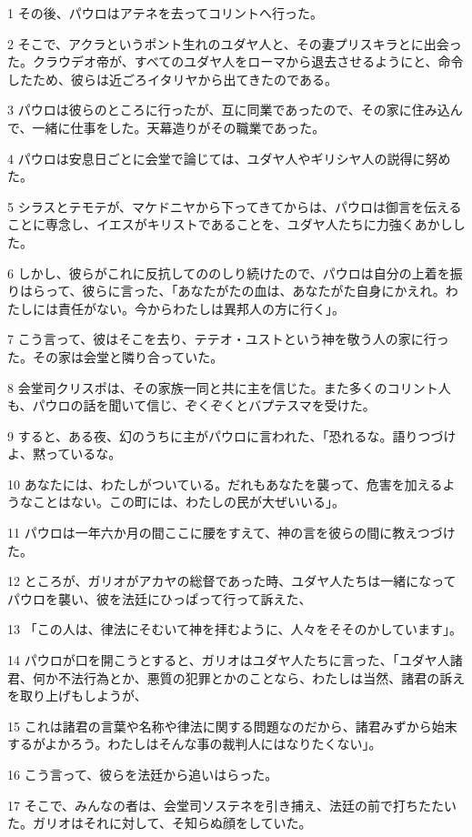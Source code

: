 \par 1 その後、パウロはアテネを去ってコリントへ行った。
\par 2 そこで、アクラというポント生れのユダヤ人と、その妻プリスキラとに出会った。クラウデオ帝が、すべてのユダヤ人をローマから退去させるようにと、命令したため、彼らは近ごろイタリヤから出てきたのである。
\par 3 パウロは彼らのところに行ったが、互に同業であったので、その家に住み込んで、一緒に仕事をした。天幕造りがその職業であった。
\par 4 パウロは安息日ごとに会堂で論じては、ユダヤ人やギリシヤ人の説得に努めた。
\par 5 シラスとテモテが、マケドニヤから下ってきてからは、パウロは御言を伝えることに専念し、イエスがキリストであることを、ユダヤ人たちに力強くあかしした。
\par 6 しかし、彼らがこれに反抗してののしり続けたので、パウロは自分の上着を振りはらって、彼らに言った、「あなたがたの血は、あなたがた自身にかえれ。わたしには責任がない。今からわたしは異邦人の方に行く」。
\par 7 こう言って、彼はそこを去り、テテオ・ユストという神を敬う人の家に行った。その家は会堂と隣り合っていた。
\par 8 会堂司クリスポは、その家族一同と共に主を信じた。また多くのコリント人も、パウロの話を聞いて信じ、ぞくぞくとバプテスマを受けた。
\par 9 すると、ある夜、幻のうちに主がパウロに言われた、「恐れるな。語りつづけよ、黙っているな。
\par 10 あなたには、わたしがついている。だれもあなたを襲って、危害を加えるようなことはない。この町には、わたしの民が大ぜいいる」。
\par 11 パウロは一年六か月の間ここに腰をすえて、神の言を彼らの間に教えつづけた。
\par 12 ところが、ガリオがアカヤの総督であった時、ユダヤ人たちは一緒になってパウロを襲い、彼を法廷にひっぱって行って訴えた、
\par 13 「この人は、律法にそむいて神を拝むように、人々をそそのかしています」。
\par 14 パウロが口を開こうとすると、ガリオはユダヤ人たちに言った、「ユダヤ人諸君、何か不法行為とか、悪質の犯罪とかのことなら、わたしは当然、諸君の訴えを取り上げもしようが、
\par 15 これは諸君の言葉や名称や律法に関する問題なのだから、諸君みずから始末するがよかろう。わたしはそんな事の裁判人にはなりたくない」。
\par 16 こう言って、彼らを法廷から追いはらった。
\par 17 そこで、みんなの者は、会堂司ソステネを引き捕え、法廷の前で打ちたたいた。ガリオはそれに対して、そ知らぬ顔をしていた。
